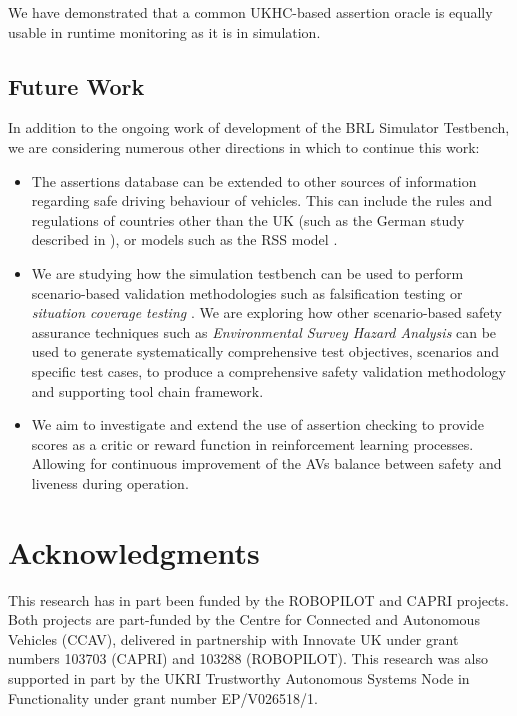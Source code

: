 We have demonstrated that a common UKHC-based assertion oracle is equally usable in runtime monitoring as it is in simulation.

\subsection{Future Work}\label{future_work}
In addition to the ongoing work of development of the BRL Simulator Testbench, we are considering numerous other directions in which to continue this work:
\begin{itemize}
    \item The assertions database can be extended to other sources of information regarding safe driving behaviour of vehicles. This can include the rules and regulations of countries other than the UK (such as the German study described in \cite{acountability}), or models such as the RSS model \cite{RSS_Shalev_Shwartz2017,RSS2_Koopman2019}.
    
    \item We are studying how the simulation testbench can be used to perform scenario-based validation methodologies such as falsification testing \cite{corso2020survey, akazaki2017causality} or \emph{situation coverage testing} \cite{alexander2015}. We are exploring how other scenario-based safety assurance techniques such as \emph{Environmental Survey Hazard Analysis}  \cite{harper2021towards} can be used to generate systematically comprehensive test objectives, scenarios and specific test cases, to produce a comprehensive safety validation methodology and supporting tool chain framework.
    
    \item We aim to investigate and extend  the use of assertion checking to provide scores as a critic or reward function in reinforcement learning processes. Allowing for continuous improvement of the AVs balance between safety and liveness during operation.
    \end{itemize}

\section{Acknowledgments}
This research has in part been funded by the ROBOPILOT and CAPRI projects. Both projects are part-funded by the Centre for Connected and Autonomous Vehicles (CCAV), delivered in partnership with Innovate UK under grant numbers 103703 (CAPRI) and 103288 (ROBOPILOT). This research was also supported in part by the UKRI Trustworthy Autonomous Systems Node in Functionality under grant number EP/V026518/1.